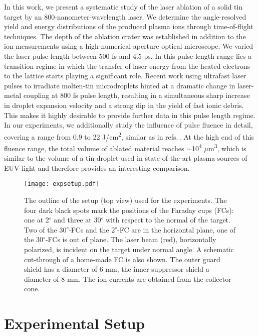 \documentclass[aip, jap, reprint, amsmath, amssymb]{revtex4-1}
\begin{document}
In this work, we present a systematic study of the laser ablation of a solid tin target by an 800-nanometer-wavelength laser. We determine the angle-resolved yield and energy distributions of the produced plasma ions through time-of-flight techniques. The depth of the ablation crater was established in addition to the ion measurements using a high-numerical-aperture optical microscope. We varied the laser pulse length between 500 fs and 4.5 ps. In this pulse length range lies a transition regime in which the transfer of laser energy from the heated electrons to the lattice starts playing a significant role\cite{pronko1995, chichkov1996}. Recent work using ultrafast laser pulses to irradiate molten-tin microdroplets hinted at a dramatic change in laser-metal coupling at 800 fs pulse length, resulting in a simultaneous sharp increase in droplet expansion velocity\cite{vinokhodov2016} and a strong dip in the yield of fast ionic debris\cite{vinokhodov2016b}. This makes it highly desirable to provide further data in this pulse length regime. In our experiments, we additionally study the influence of pulse fluence in detail, covering a range from 0.9 to 22 J/cm\textsuperscript{2}, similar as in refs.\,. At the high end of this fluence range, the total volume of ablated material reaches $\sim$10\textsuperscript{4} $\mu$m\textsuperscript{3}, which is similar to the volume of a tin droplet used in state-of-the-art plasma sources of EUV light and therefore provides an interesting comparison.

\begin{figure}[b!]
\texttt{[image: expsetup.pdf]}
\caption{The outline of the setup (top view) used for the experiments. The four dark black spots mark the positions of the Faraday cups (FCs): one at 2\textsuperscript{$\circ$} and three at 30\textsuperscript{$\circ$} with respect to the normal of the target. Two of the 30\textsuperscript{$\circ$}-FCs and the 2\textsuperscript{$\circ$}-FC are in the horizontal plane, one of the 30\textsuperscript{$\circ$}-FCs is out of plane. The laser beam (red), horizontally polarized, is incident on the target under normal angle. A schematic cut-through of a home-made FC is also shown. The outer guard shield has a diameter of 6 mm, the inner suppressor shield a diameter of 8 mm. The ion currents are obtained from the collector cone. }
\label{fig:expsetup}
\end{figure}

\section{\label{sec:expset}Experimental Setup}
\end{document}
